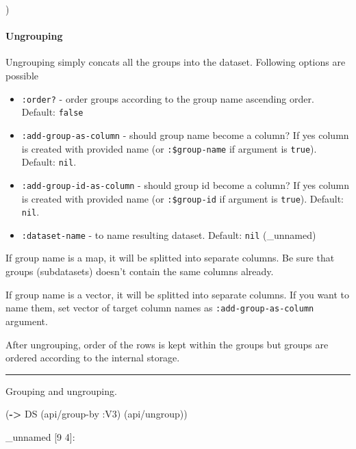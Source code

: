\documentclass[]{article}
\newenvironment{Shaded}{\begin{snugshade}}{\end{snugshade}}
\newcommand{\KeywordTok}[1]{\textcolor[rgb]{0.13,0.29,0.53}{\textbf{#1}}}
\newcommand{\AttributeTok}[1]{\textcolor[rgb]{0.77,0.63,0.00}{#1}}
\newcommand{\NormalTok}[1]{#1}
\providecommand{\tightlist}{%
  \setlength{\itemsep}{0pt}\setlength{\parskip}{0pt}}
\let\oldparagraph\paragraph
\renewcommand{\paragraph}[1]{\oldparagraph{#1}\mbox{}}
\begin{document}
)

\paragraph{Ungrouping}\label{ungrouping}

Ungrouping simply concats all the groups into the dataset. Following
options are possible

\begin{itemize}
\tightlist
\item
  \texttt{:order?} - order groups according to the group name ascending
  order. Default: \texttt{false}
\item
  \texttt{:add-group-as-column} - should group name become a column? If
  yes column is created with provided name (or \texttt{:\$group-name} if
  argument is \texttt{true}). Default: \texttt{nil}.
\item
  \texttt{:add-group-id-as-column} - should group id become a column? If
  yes column is created with provided name (or \texttt{:\$group-id} if
  argument is \texttt{true}). Default: \texttt{nil}.
\item
  \texttt{:dataset-name} - to name resulting dataset. Default:
  \texttt{nil} (\_unnamed)
\end{itemize}

If group name is a map, it will be splitted into separate columns. Be
sure that groups (subdatasets) doesn't contain the same columns already.

If group name is a vector, it will be splitted into separate columns. If
you want to name them, set vector of target column names as
\texttt{:add-group-as-column} argument.

After ungrouping, order of the rows is kept within the groups but groups
are ordered according to the internal storage.

\begin{center}\rule{0.5\linewidth}{0.5pt}\end{center}

Grouping and ungrouping.

\begin{Shaded}
\begin{Highlighting}[]
\NormalTok{(}\KeywordTok{->}\NormalTok{ DS}
\NormalTok{    (api/group-by }\AttributeTok{:V3}\NormalTok{)}
\NormalTok{    (api/ungroup))}
\end{Highlighting}
\end{Shaded}

\_unnamed {[}9 4{]}:
\end{document}
